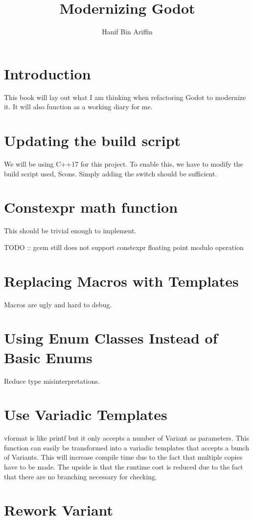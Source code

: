 \documentclass[a4paper,10pt]{book}
\title{Modernizing Godot}
\author{Hanif Bin Ariffin}
\begin{document}
\maketitle
\tableofcontents

\section{Introduction}

This book will lay out what I am thinking when refactoring Godot to modernize it.
It will also function as a working diary for me.

\section{Updating the build script}

We will be using C++17 for this project.
To enable this, we have to modify the build script used, Scons.
Simply adding the switch should be sufficient.

\section{Constexpr math function}

This should be trivial enough to implement.

TODO :: gcem still does not support constexpr floating point modulo operation

\section{Replacing Macros with Templates}

Macros are ugly and hard to debug.

\section{Using Enum Classes Instead of Basic Enums}

Reduce type misinterpretations.

\section{Use Variadic Templates}

vformat is like printf but it only accepts a number of Variant as parameters.
This function can easily be transformed into a variadic templates that accepts a bunch of Variants.
This will increase compile time due to the fact that multiple copies have to be made.
The upside is that the runtime cost is reduced due to the fact that there are no branching necessary for checking.

\section{Rework Variant}
\end{document}
